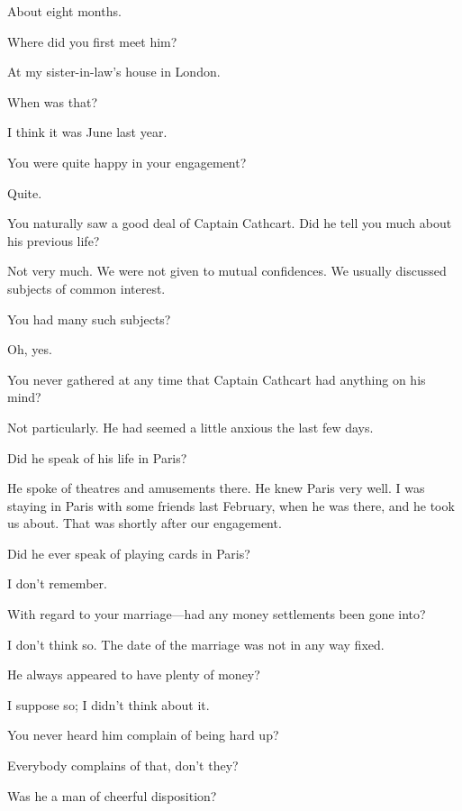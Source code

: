 \begin{dialogue}
 About eight months.

 Where did you first meet him?

 At my sister-in-law's house in London.

 When was that?

 I think it was June last year.

 You were quite happy in your engagement?

 Quite.

 You naturally saw a good deal of Captain Cathcart. Did he tell you much about his previous life?

 Not very much. We were not given to mutual confidences. We usually discussed subjects of common interest.

 You had many such subjects?

 Oh, yes.

 You never gathered at any time that Captain Cathcart had anything on his mind?

 Not particularly. He had seemed a little anxious the last few days.

 Did he speak of his life in Paris?

 He spoke of theatres and amusements there. He knew Paris very well. I was staying in Paris with some friends last February, when he was there, and he took us about. That was shortly after our engagement.

 Did he ever speak of playing cards in Paris?

 I don't remember.

 With regard to your marriage—had any money settlements been gone into?

 I don't think so. The date of the marriage was not in any way fixed.

 He always appeared to have plenty of money?

 I suppose so; I didn't think about it.

 You never heard him complain of being hard up?

 Everybody complains of that, don't they?

 Was he a man of cheerful disposition?


\end{dialogue}
